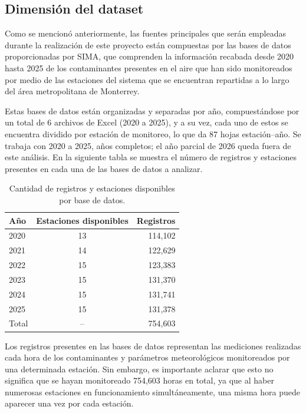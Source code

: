 \documentclass[11pt,letterpaper]{article}
\begin{document}
\subsection{Dimensi\'on del dataset}
Como se mencion\'o anteriormente, las fuentes principales que ser\'an empleadas durante la realizaci\'on de este proyecto est\'an compuestas por las bases de datos proporcionadas por SIMA, que comprenden la informaci\'on recabada desde 2020 hasta 2025 de los contaminantes presentes en el aire que han sido monitoreados por medio de las estaciones del sistema que se encuentran repartidas a lo largo del \'area metropolitana de Monterrey.

Estas bases de datos est\'an organizadas y separadas por a\~no, compuest\'andose por un total de 6 archivos de Excel (2020 a 2025), y a su vez, cada uno de estos se encuentra dividido por estaci\'on de monitoreo, lo que da 87 hojas estaci\'on--a\~no. Se trabaja con 2020 a 2025, a\~nos completos; el a\~no parcial de 2026 queda fuera de este an\'alisis. En la siguiente tabla se muestra el n\'umero de registros y estaciones presentes en cada una de las bases de datos a analizar.

\begin{table}[h]
\centering
\small
\begin{tabular}{@{}lcr@{}}
\toprule
A\~no & Estaciones disponibles & Registros \\
\midrule
2020 & 13 & 114,102 \\
2021 & 14 & 122,629 \\
2022 & 15 & 123,383 \\
2023 & 15 & 131,370 \\
2024 & 15 & 131,741 \\
2025 & 15 & 131,378 \\
\midrule
Total & -- & 754,603 \\
\bottomrule
\end{tabular}
\caption{Cantidad de registros y estaciones disponibles por base de datos.}
\label{tab:registros}
\end{table}

Los registros presentes en las bases de datos representan las mediciones realizadas cada hora de los contaminantes y par\'ametros meteorol\'ogicos monitoreados por una determinada estaci\'on. Sin embargo, es importante aclarar que esto no significa que se hayan monitoreado 754,603 horas en total, ya que al haber numerosas estaciones en funcionamiento simult\'aneamente, una misma hora puede aparecer una vez por cada estaci\'on.
\end{document}
